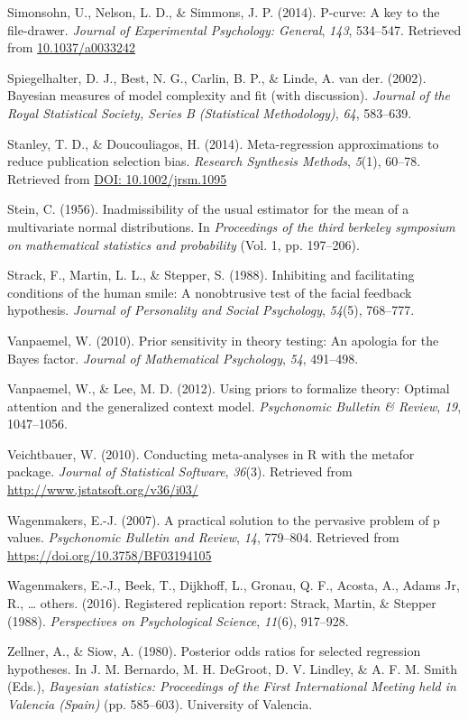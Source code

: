 \documentclass[english,man]{apa6}
\theoremstyle{definition}
\theoremstyle{definition}
\theoremstyle{remark}
\begin{document}
\hypertarget{ref-Simonsohn:etal:2014}{}
Simonsohn, U., Nelson, L. D., \& Simmons, J. P. (2014). P-curve: A key
to the file-drawer. \emph{Journal of Experimental Psychology: General},
\emph{143}, 534--547. Retrieved from \url{10.1037/a0033242}

\hypertarget{ref-Spiegelhalter:etal:2002}{}
Spiegelhalter, D. J., Best, N. G., Carlin, B. P., \& Linde, A. van der.
(2002). Bayesian measures of model complexity and fit (with discussion).
\emph{Journal of the Royal Statistical Society, Series B (Statistical
Methodology)}, \emph{64}, 583--639.

\hypertarget{ref-Stanley:Doucouliagos:2014}{}
Stanley, T. D., \& Doucouliagos, H. (2014). Meta-regression
approximations to reduce publication selection bias. \emph{Research
Synthesis Methods}, \emph{5}(1), 60--78. Retrieved from
\href{DOI:\%2010.1002/jrsm.1095}{DOI: 10.1002/jrsm.1095}

\hypertarget{ref-Stein:1956}{}
Stein, C. (1956). Inadmissibility of the usual estimator for the mean of
a multivariate normal distributions. In \emph{Proceedings of the third
berkeley symposium on mathematical statistics and probability} (Vol. 1,
pp. 197--206).

\hypertarget{ref-Strack:etal:1988}{}
Strack, F., Martin, L. L., \& Stepper, S. (1988). Inhibiting and
facilitating conditions of the human smile: A nonobtrusive test of the
facial feedback hypothesis. \emph{Journal of Personality and Social
Psychology}, \emph{54}(5), 768--777.

\hypertarget{ref-Vanpaemel:2010}{}
Vanpaemel, W. (2010). Prior sensitivity in theory testing: An apologia
for the Bayes factor. \emph{Journal of Mathematical Psychology},
\emph{54}, 491--498.

\hypertarget{ref-Vanpaemel:Lee:2012}{}
Vanpaemel, W., \& Lee, M. D. (2012). Using priors to formalize theory:
Optimal attention and the generalized context model. \emph{Psychonomic
Bulletin \& Review}, \emph{19}, 1047--1056.

\hypertarget{ref-Veichtbauer:2010}{}
Veichtbauer, W. (2010). Conducting meta-analyses in R with the metafor
package. \emph{Journal of Statistical Software}, \emph{36}(3). Retrieved
from \url{http://www.jstatsoft.org/v36/i03/}

\hypertarget{ref-Wagenmakers:2007}{}
Wagenmakers, E.-J. (2007). A practical solution to the pervasive problem
of p values. \emph{Psychonomic Bulletin and Review}, \emph{14},
779--804. Retrieved from \url{https://doi.org/10.3758/BF03194105}

\hypertarget{ref-Wagenmakers:etal:2016}{}
Wagenmakers, E.-J., Beek, T., Dijkhoff, L., Gronau, Q. F., Acosta, A.,
Adams Jr, R., \ldots{} others. (2016). Registered replication report:
Strack, Martin, \& Stepper (1988). \emph{Perspectives on Psychological
Science}, \emph{11}(6), 917--928.

\hypertarget{ref-Zellner:Siow:1980}{}
Zellner, A., \& Siow, A. (1980). Posterior odds ratios for selected
regression hypotheses. In J. M. Bernardo, M. H. DeGroot, D. V. Lindley,
\& A. F. M. Smith (Eds.), \emph{Bayesian statistics: Proceedings of the
First International Meeting held in Valencia (Spain)} (pp. 585--603).
University of Valencia.
\end{document}
